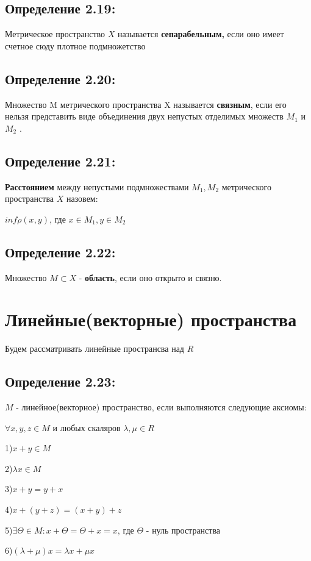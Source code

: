 \documentclass[12pt, english]{article}
\begin{document}
\subsection*{Определение 2.19:}	 	
	 Метрическое пространство $X$ называется \textbf{сепарабельным,}
		если оно имеет счетное сюду плотное подмножетство

\subsection*{Определение 2.20:}	 		
	Множество M метрического пространства X называется \textbf{связным}, если его нельзя представить виде объединения двух непустых отделимых множеств $M_1$ и $M_2$ .
		
\subsection*{Определение 2.21:}
	\textbf{Расстоянием} между непустыми подмножествами $M_1, M_2$ метрического пространства $X$ назовем:
	
	$inf \rho(x,y)$, где $x \in M_1 , y \in M_2$
	
\subsection*{Определение 2.22:}
	Множество $M \subset X$ - \textbf{область}, если оно открыто и связно.


\section{Линейные(векторные) пространства}
	Будем рассматривать линейные пространсва над $R$
	
\subsection*{Определение 2.23:}
	$M$ - линейное(векторное) пространство, если выполняются следующие аксиомы:
	
	$\forall x,y,z \in M$  и любых скаляров $\lambda,\mu \in R$
	
	1)$ x + y \in M$
	
	2)$ \lambda x \in M$
	
	3)$x + y = y + x$
	
	4)$x + (y + z) = (x + y) + z$
	
	5)$\exists \Theta \in M : x + \Theta = \Theta + x = x$, где $\Theta$ - нуль пространства
	
	6)$(\lambda + \mu)x = \lambda x + \mu x$
	
\end{document}
